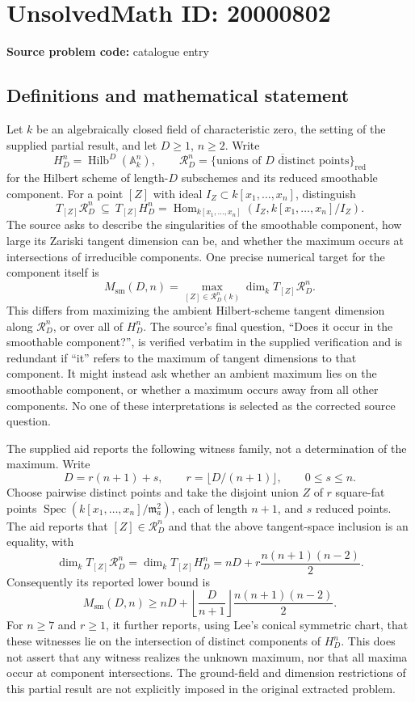 \documentclass[11pt]{article}
\newcommand{\A}{\mathbb{A}}
\begin{document}
\section*{UnsolvedMath ID: 20000802}
\textbf{Source problem code:} catalogue entry
\subsection{Definitions and mathematical statement}
Let \(k\) be an algebraically closed field of characteristic zero, the setting of the supplied partial result, and let \(D\ge1\), \(n\ge2\). Write
\[
 H_D^n=\operatorname{Hilb}^{D}(\A_k^n),\qquad
 \mathcal R_D^n=\overline{\{\text{unions of }D\text{ distinct points}\}}_{\mathrm{red}}
\]
for the Hilbert scheme of length-\(D\) subschemes and its reduced smoothable component. For a point \([Z]\) with ideal \(I_Z\subset k[x_1,\ldots,x_n]\), distinguish
\[
 T_{[Z]}\mathcal R_D^n\ \subseteq\ T_{[Z]}H_D^n
 =\operatorname{Hom}_{k[x_1,\ldots,x_n]}(I_Z,k[x_1,\ldots,x_n]/I_Z).
\]
The source asks to describe the singularities of the smoothable component, how large its Zariski tangent dimension can be, and whether the maximum occurs at intersections of irreducible components. One precise numerical target for the component itself is
\[
 M_{\mathrm{sm}}(D,n)=\max_{[Z]\in\mathcal R_D^n(k)}\dim_kT_{[Z]}\mathcal R_D^n.
\]
This differs from maximizing the ambient Hilbert-scheme tangent dimension along \(\mathcal R_D^n\), or over all of \(H_D^n\). The source's final question, ``Does it occur in the smoothable component?'', is verified verbatim in the supplied verification and is redundant if ``it'' refers to the maximum of tangent dimensions to that component. It might instead ask whether an ambient maximum lies on the smoothable component, or whether a maximum occurs away from all other components. No one of these interpretations is selected as the corrected source question.

The supplied aid reports the following witness family, not a determination of the maximum. Write
\[
 D=r(n+1)+s,\qquad r=\lfloor D/(n+1)\rfloor,\qquad0\le s\le n.
\]
Choose pairwise distinct points and take the disjoint union \(Z\) of \(r\) square-fat points \(\operatorname{Spec}(k[x_1,\ldots,x_n]/\mathfrak m_a^2)\), each of length \(n+1\), and \(s\) reduced points. The aid reports that \([Z]\in\mathcal R_D^n\) and that the above tangent-space inclusion is an equality, with
\[
 \dim_kT_{[Z]}\mathcal R_D^n
 =\dim_kT_{[Z]}H_D^n
 =nD+r\frac{n(n+1)(n-2)}2.
\]
Consequently its reported lower bound is
\[
 M_{\mathrm{sm}}(D,n)\ge
 nD+\left\lfloor\frac D{n+1}\right\rfloor\frac{n(n+1)(n-2)}2.
\]
For \(n\ge7\) and \(r\ge1\), it further reports, using Lee's conical symmetric chart, that these witnesses lie on the intersection of distinct components of \(H_D^n\). This does not assert that any witness realizes the unknown maximum, nor that all maxima occur at component intersections. The ground-field and dimension restrictions of this partial result are not explicitly imposed in the original extracted problem.
\end{document}
